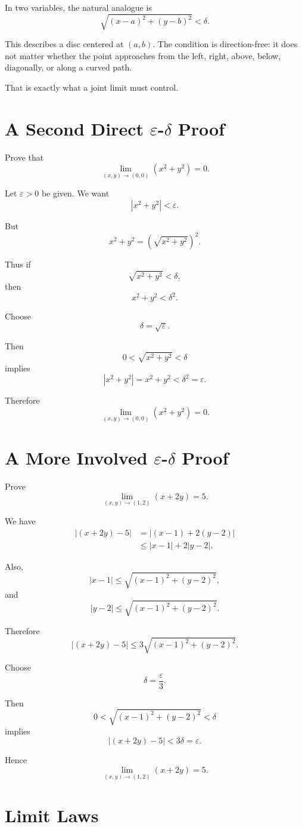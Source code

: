 \documentclass[11pt,oneside]{book}
\theoremstyle{studentthm}
\theoremstyle{definition}
\newcommand{\eps}{\varepsilon}
\begin{document}
In two variables, the natural analogue is
\[
\sqrt{(x-a)^2+(y-b)^2}<\delta.
\]

This describes a disc centered at \((a,b)\). The condition is
direction-free: it does not matter whether the point approaches from
the left, right, above, below, diagonally, or along a curved path.

That is exactly what a joint limit must control.

\section{A Second Direct \(\eps\)-\(\delta\) Proof}

Prove that
\[
\lim_{(x,y)\to(0,0)}(x^2+y^2)=0.
\]

Let \(\eps>0\) be given. We want
\[
|x^2+y^2|<\eps.
\]

But
\[
x^2+y^2
=
\left(\sqrt{x^2+y^2}\right)^2.
\]

Thus if
\[
\sqrt{x^2+y^2}<\delta,
\]
then
\[
x^2+y^2<\delta^2.
\]

Choose
\[
\delta=\sqrt{\eps}.
\]

Then
\[
0<\sqrt{x^2+y^2}<\delta
\]
implies
\[
|x^2+y^2|
=
x^2+y^2
<
\delta^2
=
\eps.
\]

Therefore
\[
\lim_{(x,y)\to(0,0)}(x^2+y^2)=0.
\]

\section{A More Involved \(\eps\)-\(\delta\) Proof}

Prove
\[
\lim_{(x,y)\to(1,2)}(x+2y)=5.
\]

We have
\[
\begin{aligned}
|(x+2y)-5|
&=
|(x-1)+2(y-2)|\\
&\le
|x-1|+2|y-2|.
\end{aligned}
\]

Also,
\[
|x-1|
\le
\sqrt{(x-1)^2+(y-2)^2},
\]
and
\[
|y-2|
\le
\sqrt{(x-1)^2+(y-2)^2}.
\]

Therefore
\[
|(x+2y)-5|
\le
3\sqrt{(x-1)^2+(y-2)^2}.
\]

Choose
\[
\delta=\frac{\eps}{3}.
\]

Then
\[
0<
\sqrt{(x-1)^2+(y-2)^2}
<\delta
\]
implies
\[
|(x+2y)-5|<3\delta=\eps.
\]

Hence
\[
\lim_{(x,y)\to(1,2)}(x+2y)=5.
\]

\section{Limit Laws}
\end{document}
